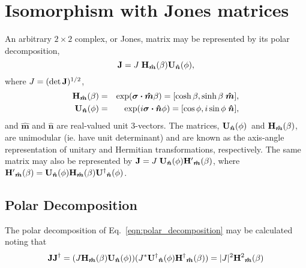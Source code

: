 \documentclass[12pt]{article}
\newcommand{\boost}[1][]{{\ensuremath{ {\bf H}{#1}_{\bm{\hat m}}(\beta) }}}
\newcommand{\rotat}[1][]{{\ensuremath{ {\bf U}{#1}_{\bm{\hat n}}(\phi) }}}
\begin{document}
\section{Isomorphism with Jones matrices}

An arbitrary $2\times2$ complex, or Jones, matrix may be represented
by its polar decomposition,
\begin{equation}
{\bf J} = J \; \boost \rotat,
\label{eqn:polar_decomposition}
\end{equation}
where $J=(\det{\bf J})^{1/2}$,
\begin{eqnarray}
\boost &=& \exp(\bm{\sigma\cdot}\bm{\hat m}\beta)
        = [\cosh\beta,\sinh\beta\;\bm{\hat m}],
\label{eqn:boost} \\
\rotat &=& \exp(i\bm{\sigma\cdot}\bm{\hat n}\phi)
        = [\cos\phi,i\sin\phi\;\bm{\hat n}],
\label{eqn:rotation}
\end{eqnarray}
and $\bm{\hat m}$ and $\bm{\hat n}$ are real-valued unit 3-vectors.
The matrices, \rotat\ and \boost, are unimodular (ie. have unit
determinant) and are known as the axis-angle representation of unitary
and Hermitian transformations, respectively. The same matrix may also
be represented by ${\bf J}=J\;\rotat\boost[^\prime]$, where
$\boost[^\prime]=\rotat\boost\rotat[^\dagger]$.

\subsection{Polar Decomposition}
\label{sec:polar_decomposition}

The polar decomposition of Eq.~\ref{eqn:polar_decomposition} may be 
calculated noting that
\begin{equation}
{\bf JJ}^\dagger = (J\boost\rotat)(J^*\rotat[^\dagger]\boost[^\dagger])
	= |J|^2 \boost[^2]
\end{equation}
\end{document}
